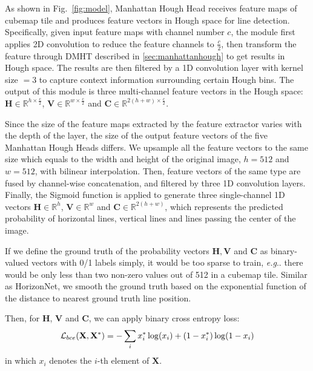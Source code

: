 \documentclass[runningheads]{llncs}
\makeatletter
\DeclareRobustCommand\onedot{\futurelet\@let@token\@onedot}
\def\@onedot{\ifx\@let@token.\else.\null\fi\xspace}
\def\eg{\emph{e.g}\onedot} \def\Eg{\emph{E.g}\onedot}
\makeatother
\begin{document}
As shown in Fig.~\ref{fig:model}, Manhattan Hough Head receives feature maps of cubemap tile and produces feature vectors in Hough space for line detection. Specifically, given input feature maps with channel number $c$, the module first applies 2D convolution to reduce the feature channels to $\frac{c}{2}$, then transform the feature through DMHT described in \ref{sec:manhattanhough} to get results in Hough space. The results are then filtered by a 1D convolution layer with kernel size $=3$ to capture context information surrounding certain Hough bins. The output of this module is three multi-channel feature vectors in the Hough space: $\mathbf{H}\in \mathbb{R}^{h\times \frac{c}{2}}$, $\mathbf{V}\in \mathbb{R}^{w\times \frac{c}{2}}$ and $\mathbf{C}\in \mathbb{R}^{2(h+w)\times \frac{c}{2}}$. 

Since the size of the feature maps extracted by the feature extractor varies with the depth of the layer, the size of the output feature vectors of the five Manhattan Hough Heads differs. We upsample all the feature vectors to the same size which equals to the width and height of the original image, $h=512$ and $w=512$, with bilinear interpolation. Then, feature vectors of the same type are fused by channel-wise concatenation, and filtered by three 1D convolution layers.
Finally, the Sigmoid function is applied to generate three single-channel 1D vectors $\mathbf{H}\in\mathbb{R}^{h}$, $\mathbf{V}\in\mathbb{R}^{w}$ and $\mathbf{C}\in\mathbb{R}^{2(h+w)}$, which represents the predicted probability of horizontal lines, vertical lines and lines passing the center of the image. 

If we define the ground truth of the probability vectors $\mathbf{H}, \mathbf{V}$ and $\mathbf{C}$ as binary-valued vectors with 0/1 labels simply, it would be too sparse to train, \eg there would be only less than two non-zero values out of 512 in a cubemap tile.
Similar as HorizonNet\cite{sun2019horizonnet}, we smooth the ground truth based on the exponential function of the distance to nearest ground truth line position. 


Then, for $\mathbf{H}$, $\mathbf{V}$ and $\mathbf{C}$, we can apply binary cross entropy loss:
\begin{equation}
\mathcal{L}_{bce}(\mathbf{X}, \mathbf{X}^*) = - \sum_{i} x_i^* \log(x_i) + (1 - x_i^*)\log(1-x_i)\\
\end{equation}
in which $x_i$ denotes the $i$-th element of $\mathbf{X}$.
\end{document}
